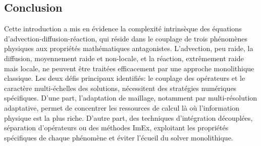\subsection{Conclusion}
Cette introduction a mis en évidence la complexité intrinsèque des équations d'advection-diffusion-réaction, 
qui réside dans le couplage de trois phénomènes physiques aux propriétés mathématiques antagonistes. 
L'advection, peu raide, la diffusion, moyennement raide et non-locale, et la réaction, extrêmement raide mais locale, 
ne peuvent être traitées efficacement par une approche monolithique classique.
Les deux défis principaux identifiés: le couplage des opérateurs et le caractère multi-échelles des solutions, 
nécessitent des stratégies numériques spécifiques. 
D'une part, l'adaptation de maillage, notamment par multi-résolution adaptative, permet de concentrer les ressources de calcul là où l'information physique est la plus riche. 
D'autre part, des techniques d'intégration découplées, séparation d'opérateurs ou des méthodes ImEx, exploitant les propriétés spécifiques de chaque phénomène et éviter l'écueil du solver monolithique.